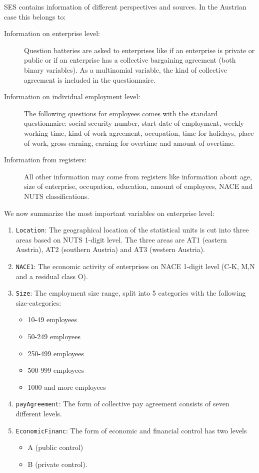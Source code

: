 \documentclass[12pt]{scrartcl}\usepackage[]{graphicx}\usepackage[]{color}
\begin{document}
\noindent SES contains information of different perspectives and sources. In the Austrian case this belongs to:

\begin{description}
\item[Information on enterprise level:] Question batteries are asked to enterprises like if an enterprise is private or public or if an enterprise has a collective bargaining agreement (both binary variables). As a multinomial variable, the kind of collective agreement is included in the questionnaire.
\item[Information on individual employment level:] The following questions for employees comes with the standard questionnaire: social security number, start date of employment, weekly working time, kind of work agreement, occupation, time for holidays, place of work, gross earning, earning for overtime and amount of overtime.
\item[Information from registers:] All other information may come from registers like information about age, size of enterprise, occupation, education, amount of employees, NACE and NUTS classifications.
\end{description}

\noindent We now summarize the most important variables on enterprise level:
\begin{enumerate}
\item \texttt{Location}: The geographical location of the statistical units is cut into three areas based on NUTS 1-digit level. The three areas are AT1 (eastern Austria), AT2 (southern Austria) and AT3 (western Austria).
\item \texttt{NACE1}: The economic activity of enterprises on NACE 1-digit level (C-K, M,N and a residual class O).
\item \texttt{Size}: The employment size range, split into 5 categories with the following size-categories:
\begin{itemize}
\item 10-49 employees
\item 50-249 employees
\item 250-499 employees
\item 500-999 employees
\item 1000 and more employees
\end{itemize}

\item \texttt{payAgreement}: The form of collective pay agreement consists of seven different levels.
\item \texttt{EconomicFinanc}: The form of economic and financial control has two levels
\begin{itemize}
\item A (public control)
\item B (private control).
\end{itemize}
\end{enumerate}
\end{document}
